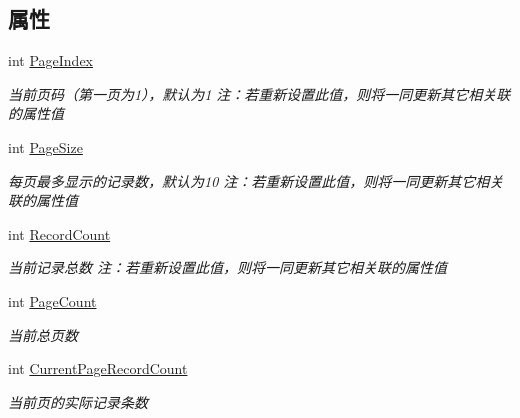 \subsection*{属性}
\begin{DoxyCompactItemize}
\item 
int \hyperlink{class_x_c_l_net_tools_1_1_entity_1_1_pager_info_a2cd0abb6744c59bbd9b98c758a023ac5}{Page\-Index}
\begin{DoxyCompactList}\small\item\em 当前页码（第一页为1），默认为1 注：若重新设置此值，则将一同更新其它相关联的属性值 \end{DoxyCompactList}\item 
int \hyperlink{class_x_c_l_net_tools_1_1_entity_1_1_pager_info_af9b5f737263571d79ead065f6faaa5ca}{Page\-Size}
\begin{DoxyCompactList}\small\item\em 每页最多显示的记录数，默认为10 注：若重新设置此值，则将一同更新其它相关联的属性值 \end{DoxyCompactList}\item 
int \hyperlink{class_x_c_l_net_tools_1_1_entity_1_1_pager_info_a5617d4aaafa80fa664f13cfe7fbc1a6c}{Record\-Count}
\begin{DoxyCompactList}\small\item\em 当前记录总数 注：若重新设置此值，则将一同更新其它相关联的属性值 \end{DoxyCompactList}\item 
int \hyperlink{class_x_c_l_net_tools_1_1_entity_1_1_pager_info_a986467ea00c659d4c81c036f2bfaa1b9}{Page\-Count}
\begin{DoxyCompactList}\small\item\em 当前总页数 \end{DoxyCompactList}\item 
int \hyperlink{class_x_c_l_net_tools_1_1_entity_1_1_pager_info_ac873f1babc543a806b6ec686bf9fc86a}{Current\-Page\-Record\-Count}
\begin{DoxyCompactList}\small\item\em 当前页的实际记录条数 \end{DoxyCompactList}\item 

\end{DoxyCompactItemize}
